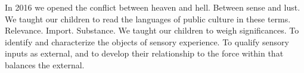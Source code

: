 

In 2016 we opened the conflict between heaven and hell.  Between sense
and lust.  We taught our children to read the languages of public
culture in these terms.  Relevance.  Import.  Substance.  We taught
our children to weigh significances.  To identify and characterize the
objects of sensory experience.  To qualify sensory inputs as external,
and to develop their relationship to the force within that balances
the external.

\bye
